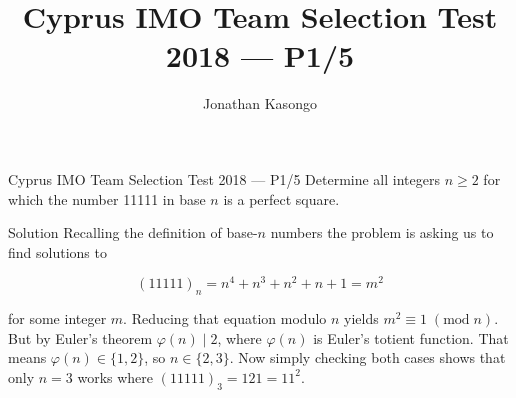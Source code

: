 \documentclass{article}
\author{Jonathan Kasongo}
\title{Cyprus IMO Team Selection Test 2018 --- P1/5}
\begin{document}
\maketitle

\begin{problem}{Cyprus IMO Team Selection Test 2018 --- P1/5}
Determine all integers $n \geq 2$ for which the number 11111 in base $n$
is a perfect square.
\end{problem}

\begin{solution}{Solution}
Recalling the definition of base-$n$ numbers the problem is asking us to
find solutions to

$$
(11111)_n = n^4 + n^3 + n^2 + n + 1 = m^2
$$

for some integer $m$. Reducing that equation modulo $n$ yields
$m^2 \equiv 1 \; (\text{mod} \;  n)$. But by Euler's theorem
$\varphi(n) \mid 2$, where $\varphi(n)$ is Euler's totient function.
That means $\varphi(n) \in \{1, 2\}$, so $n \in \{2, 3\}$. Now simply
checking both cases shows that only $n=3$ works where
$(11111)_3 = 121 = 11^2$.


\end{solution}
\end{document}
